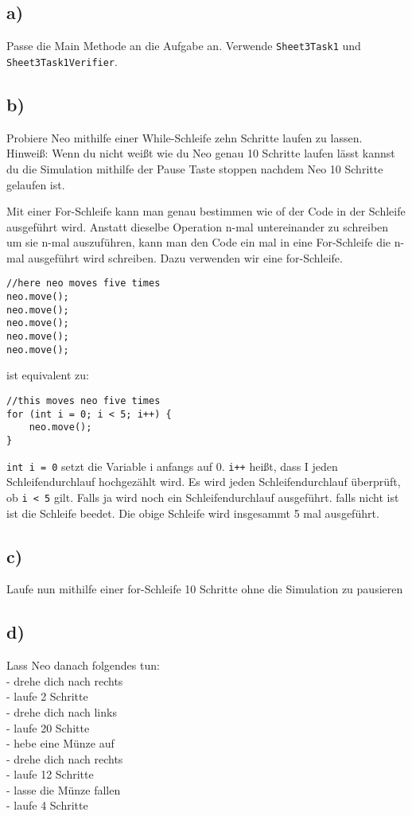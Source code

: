 \subsection*{a)}
	Passe die Main Methode an die Aufgabe an. Verwende \lstinline{Sheet3Task1} und \lstinline{Sheet3Task1Verifier}.
\subsection*{b)}
	Probiere Neo mithilfe einer While-Schleife zehn Schritte laufen zu lassen.\\
	Hinweiß: Wenn du nicht weißt wie du Neo genau 10 Schritte laufen lässt kannst du die Simulation mithilfe der Pause Taste stoppen nachdem Neo 10 Schritte gelaufen ist.

\begin{Infobox}
		Mit einer For-Schleife kann man genau bestimmen wie of der Code in der Schleife ausgeführt wird.
		Anstatt dieselbe Operation n-mal untereinander zu schreiben um sie n-mal auszuführen, kann man den Code ein mal in eine For-Schleife die n-mal ausgeführt wird schreiben.
		Dazu verwenden wir eine for-Schleife. 
		\begin{lstlisting}
//here neo moves five times
neo.move();
neo.move();
neo.move();
neo.move();
neo.move();
		\end{lstlisting}
		ist equivalent zu:
		\begin{lstlisting}
//this moves neo five times
for (int i = 0; i < 5; i++) {
	neo.move();
}
		\end{lstlisting}
 \lstinline{int i = 0} setzt die Variable i anfangs auf 0.  \lstinline{i++} heißt, dass I jeden Schleifendurchlauf hochgezählt wird. Es wird jeden Schleifendurchlauf überprüft, ob  \lstinline{i < 5} gilt. Falls ja wird noch ein Schleifendurchlauf ausgeführt. falls nicht ist ist die Schleife beedet. Die obige Schleife wird insgesammt 5 mal ausgeführt.
 \end{Infobox}

\subsection*{c)}
Laufe nun mithilfe einer for-Schleife 10 Schritte ohne die Simulation zu pausieren

\subsection*{d)}
Lass Neo danach folgendes tun:\\
	- drehe dich nach rechts\\
	- laufe 2 Schritte\\
	- drehe dich nach links\\ 
	- laufe 20 Schitte\\
	- hebe eine Münze auf\\
	- drehe dich nach rechts\\
	- laufe 12 Schritte\\
	- lasse die Münze fallen\\
	- laufe 4 Schritte


